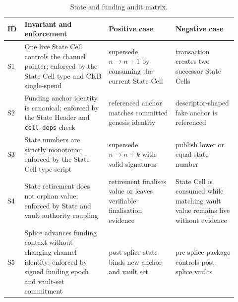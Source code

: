 \documentclass[a4paper,11pt]{article}
\begin{document}
\begin{table}[H]
\centering
\footnotesize
\setlength{\tabcolsep}{4pt}
\begin{tabular}{L{0.06\linewidth}L{0.34\linewidth}L{0.27\linewidth}L{0.25\linewidth}}
\toprule
ID & Invariant and enforcement & Positive case & Negative case \\
\midrule
S1 & One live State Cell controls the channel pointer; enforced by the State Cell type and CKB single-spend & supersede $n \rightarrow n+1$ by consuming the current State Cell & transaction creates two successor State Cells \\
S2 & Funding anchor identity is canonical; enforced by the State Header and \texttt{cell\_deps} check & referenced anchor matches committed genesis identity & descriptor-shaped fake anchor is referenced \\
S3 & State numbers are strictly monotonic; enforced by the State Cell type script & supersede $n \rightarrow n+k$ with valid signatures & publish lower or equal state number \\
S4 & State retirement does not orphan value; enforced by State and vault authority coupling & retirement finalises value or leaves verifiable finalisation evidence & State Cell is consumed while matching vault value remains live without evidence \\
S5 & Splice advances funding context without changing channel identity; enforced by signed funding epoch and vault-set commitment & post-splice state binds new anchor and vault set & pre-splice package controls post-splice vaults \\
\bottomrule
\end{tabular}
\caption{State and funding audit matrix.}
\label{tab:audit-state-funding}
\end{table}
\end{document}
